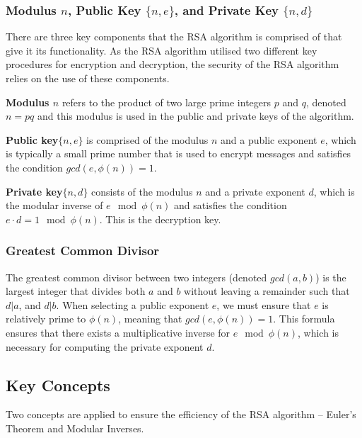\documentclass{article}
\begin{document}
\subsubsection{Modulus $n$, Public Key $\{n, e\}$, and Private Key $\{n, d\}$}
There are three key components that the RSA algorithm is comprised of that give it its functionality. As the RSA algorithm utilised two different key procedures for encryption and decryption, the security of the RSA algorithm relies on the use of these components. 

\textbf{Modulus $n$} refers to the product of two large prime integers $p$ and $q$, denoted $n = pq$ and this modulus is used in the public and private keys of the algorithm. 

\textbf{Public key}$\{n, e\}$ is comprised of the modulus $n$ and a public exponent $e$, which is typically a small prime number that is used to encrypt messages and satisfies the condition $gcd(e, \phi(n)) = 1$. 

\textbf{Private key}$\{n, d\}$ consists of the modulus $n$ and a private exponent $d$, which is the modular inverse of $e \mod \phi (n)$ and satisfies the condition $e \cdot d = 1 \mod \phi(n)$. This is the decryption key.

\subsubsection{Greatest Common Divisor}
The greatest common divisor between two integers (denoted $gcd(a, b)$) is the largest integer that divides both $a$ and $b$ without leaving a remainder such that $d | a$, and $d | b$. When selecting a public exponent $e$, we must ensure that $e$ is relatively prime to $\phi(n)$, meaning that $gcd(e, \phi(n)) = 1$. This formula ensures that there exists a multiplicative inverse for $e\mod \phi (n)$, which is necessary for computing the private exponent $d$. 

\subsection{Key Concepts}
Two concepts are applied to ensure the efficiency of the RSA algorithm – Euler's Theorem \cite{eulerstheorem} and Modular Inverses.
\end{document}
